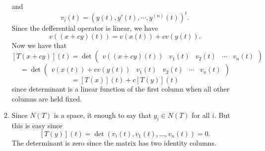 \begin{enumerate}
\begin{enumerate}
 and 
\[v_i(t)=(y(t),y'(t),\cdots ,y^{(n)}(t))^t.\]
Since the defferential operator is linear, we have 
\[v((x+cy)(t))=v(x(t))+cv(y(t)).\]
Now we have that 
\[[T(x+cy)](t)=\det\begin{pmatrix}v((x+cy)(t))&v_1(t)&v_2(t)&\cdots &v_n(t)\end{pmatrix}\]
\[=\det\begin{pmatrix}v(x(t))+cv(y(t))&v_1(t)&v_2(t)&\cdots &v_n(t)\end{pmatrix}\]
\[=[T(x)](t)+c[T(y)](t)\]
since determinant is a linear function of the first column when all other columns are held fixed.
\item Since $N(T)$ is a space, it enough to say that $y_i\in N(T)$ for all $i$. But this is easy since 
\[[T(y)](t)=\det(v_i(t),v_1(t),\ldots ,v_n(t))=0.\]
The determinant is zero since the matrix has two identity columns.
\end{enumerate}
\end{enumerate}
